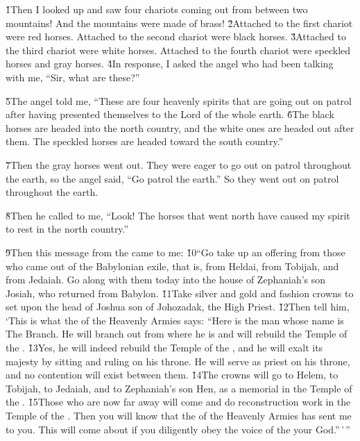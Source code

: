 \v{1}Then I looked up and saw four chariots coming out from between two mountains! And the mountains were made of brass! \v{2}Attached to the first chariot were red horses. Attached to the second chariot were black horses. \v{3}Attached to the third chariot were white horses. Attached to the fourth chariot were speckled horses and gray horses. \v{4}In response, I asked the angel who had been talking with me, ``Sir, what are these?''

\v{5}The angel told me, ``These are four heavenly spirits that are going out on patrol after having presented themselves to the Lord of the whole earth. \v{6}The black horses are headed into the north country, and the white ones are headed out after them. The speckled horses are headed toward the south country.''

\v{7}Then the gray horses went out. They were eager to go out on patrol throughout the earth, so the angel said, ``Go patrol the earth.'' So they went out on patrol throughout the earth.

\v{8}Then he called to me, ``Look! The horses that went north have caused my spirit to rest in the north country.''

\v{9}Then this message from the  came to me: \v{10}``Go take up an offering from those who came out of the Babylonian exile, that is, from Heldai, from Tobijah, and from Jedaiah. Go along with them today into the house of Zephaniah's son Josiah, who returned from Babylon. \v{11}Take silver and gold and fashion crowns to set upon the head of Joshua son of Johozadak, the High Priest. \v{12}Then tell him, `This is what the  of the Heavenly Armies says: ``Here is the man whose name is The Branch. He will branch out from where he is and will rebuild the Temple of the . \v{13}Yes, he will indeed rebuild the Temple of the , and he will exalt its majesty by sitting and ruling on his throne. He will serve as priest on his throne, and no contention will exist between them. \v{14}The crowns will go to Helem, to Tobijah, to Jedaiah, and to Zephaniah's son Hen, as a memorial in the Temple of the . \v{15}Those who are now far away will come and do reconstruction work in the Temple of the . Then you will know that the  of the Heavenly Armies has sent me to you. This will come about if you diligently obey the voice of the  your God.''\,'\,''

